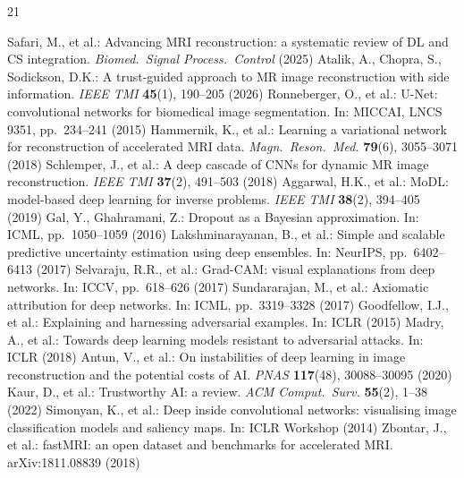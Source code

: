 \documentclass[runningheads]{llncs}
\begin{document}
\vspace{-3mm}
\begin{thebibliography}{21}
\footnotesize
\setlength{\itemsep}{-2pt}
\setlength{\parsep}{0pt}

 Safari, M., et al.: Advancing MRI reconstruction: a systematic review of DL and CS integration. \textit{Biomed.\ Signal Process.\ Control} (2025)
 Atalik, A., Chopra, S., Sodickson, D.K.: A trust-guided approach to MR image reconstruction with side information. \textit{IEEE TMI} \textbf{45}(1), 190--205 (2026)
 Ronneberger, O., et al.: U-Net: convolutional networks for biomedical image segmentation. In: MICCAI, LNCS 9351, pp.~234--241 (2015)
 Hammernik, K., et al.: Learning a variational network for reconstruction of accelerated MRI data. \textit{Magn.\ Reson.\ Med.} \textbf{79}(6), 3055--3071 (2018)
 Schlemper, J., et al.: A deep cascade of CNNs for dynamic MR image reconstruction. \textit{IEEE TMI} \textbf{37}(2), 491--503 (2018)
 Aggarwal, H.K., et al.: MoDL: model-based deep learning for inverse problems. \textit{IEEE TMI} \textbf{38}(2), 394--405 (2019)
 Gal, Y., Ghahramani, Z.: Dropout as a Bayesian approximation. In: ICML, pp.~1050--1059 (2016)
 Lakshminarayanan, B., et al.: Simple and scalable predictive uncertainty estimation using deep ensembles. In: NeurIPS, pp.~6402--6413 (2017)
 Selvaraju, R.R., et al.: Grad-CAM: visual explanations from deep networks. In: ICCV, pp.~618--626 (2017)
 Sundararajan, M., et al.: Axiomatic attribution for deep networks. In: ICML, pp.~3319--3328 (2017)
 Goodfellow, I.J., et al.: Explaining and harnessing adversarial examples. In: ICLR (2015)
 Madry, A., et al.: Towards deep learning models resistant to adversarial attacks. In: ICLR (2018)
 Antun, V., et al.: On instabilities of deep learning in image reconstruction and the potential costs of AI. \textit{PNAS} \textbf{117}(48), 30088--30095 (2020)
 Kaur, D., et al.: Trustworthy AI: a review. \textit{ACM Comput.\ Surv.} \textbf{55}(2), 1--38 (2022)
 Simonyan, K., et al.: Deep inside convolutional networks: visualising image classification models and saliency maps. In: ICLR Workshop (2014)
 Zbontar, J., et al.: fastMRI: an open dataset and benchmarks for accelerated MRI. arXiv:1811.08839 (2018)

\end{thebibliography}
\end{document}
